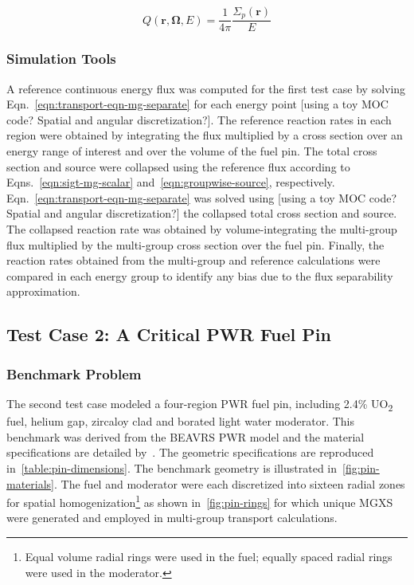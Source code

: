 \begin{dmath}
\label{eqn:test-source-ce}
Q(\mathbf{r},\mathbf{\Omega},E) = \frac{1}{4\pi} \frac{\Sigma_{p}(\mathbf{r})}{E}
\end{dmath}


\subsubsection{Simulation Tools}
\label{subsubsec:sim-tools-case1}

A reference continuous energy flux was computed for the first test case by solving Eqn.~\ref{eqn:transport-eqn-mg-separate} for each energy point {\color{red}[using a toy MOC code? Spatial and angular discretization?]}. The reference reaction rates in each region were obtained by integrating the flux multiplied by a cross section over an energy range of interest and over the volume of the fuel pin. The total cross section and source were collapsed using the reference flux according to Eqns.~\ref{eqn:sigt-mg-scalar} and~\ref{eqn:groupwise-source}, respectively. Eqn.~\ref{eqn:transport-eqn-mg-separate} was solved using {\color{red}[using a toy MOC code? Spatial and angular discretization?]} the collapsed total cross section and source. The collapsed reaction rate was obtained by volume-integrating the multi-group flux multiplied by the multi-group cross section over the fuel pin. Finally, the reaction rates obtained from the multi-group and reference calculations were compared in each energy group to identify any bias due to the flux separability approximation.


\subsection{Test Case 2: A Critical PWR Fuel Pin}
\label{subsec:test-case2}

\subsubsection{Benchmark Problem}
\label{subsubsec:benchmark-case2}

The second test case modeled a four-region PWR fuel pin, including  2.4\% UO\textsubscript{2} fuel, helium gap, zircaloy clad and borated light water moderator. This benchmark was derived from the BEAVRS PWR model and the material specifications are detailed by~\cite{horelik2013beavrs}. The geometric specifications are reproduced in~\autoref{table:pin-dimensions}. The benchmark geometry is illustrated in~\autoref{fig:pin-materials}. The fuel and moderator were each discretized into sixteen radial zones for spatial homogenization\footnote{Equal volume radial rings were used in the fuel; equally spaced radial rings were used in the moderator.} as shown in~\autoref{fig:pin-rings} for which unique MGXS were generated and employed in multi-group transport calculations.

